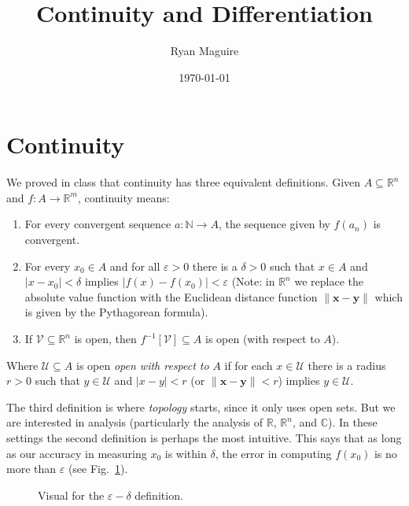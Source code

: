 \documentclass{article}
\title{Continuity and Differentiation}
\author{Ryan Maguire}
\date{\today}
\theoremstyle{normal}
\begin{document}
    \maketitle
    \section{Continuity}
        We proved in class that continuity has three equivalent
        definitions. Given $A\subseteq\mathbb{R}^{n}$ and
        $f:A\rightarrow\mathbb{R}^{m}$, continuity means:
        \begin{enumerate}
            \item
                For every convergent sequence
                $a:\mathbb{N}\rightarrow{A}$, the sequence
                given by $f(a_{n})$ is convergent.
            \item
                For every $x_{0}\in{A}$ and for all $\varepsilon>0$ there is
                a $\delta>0$ such that $x\in{A}$ and
                $|x-x_{0}|<\delta$ implies $|f(x)-f(x_{0})|<\varepsilon$
                (Note: in $\mathbb{R}^{n}$ we replace the absolute value
                function with the Euclidean distance function
                $\|\mathbf{x}-\mathbf{y}\|$ which is given by the
                Pythagorean formula).
            \item
                If $\mathcal{V}\subseteq\mathbb{R}^{n}$ is open, then
                $f^{-1}[\mathcal{V}]\subseteq{A}$ is open (with respect to $A$).
        \end{enumerate}
        Where $\mathcal{U}\subseteq{A}$ is open \textit{open with respect to}
        $A$ if for each $x\in\mathcal{U}$ there is a radius
        $r>0$ such that $y\in\mathcal{U}$ and $|x-y|<r$
        (or $\|\mathbf{x}-\mathbf{y}\|<r$) implies $y\in\mathcal{U}$.
        \par\hfill\par
        The third definition is where \textit{topology} starts, since it
        only uses open sets. But we are interested in analysis (particularly
        the analysis of $\mathbb{R}$, $\mathbb{R}^{n}$, and
        $\mathbb{C}$). In these settings the second definition is perhaps the
        most intuitive. This says that as long as our accuracy in measuring
        $x_{0}$ is within $\delta$, the error in computing $f(x_{0})$ is no
        more than $\varepsilon$ (see Fig.~\ref{fig:eps_delta_def}).
        \begin{figure}
            \centering
            \caption{Visual for the $\varepsilon-\delta$ definition.}
            \label{fig:eps_delta_def}
        \end{figure}
\end{document}
